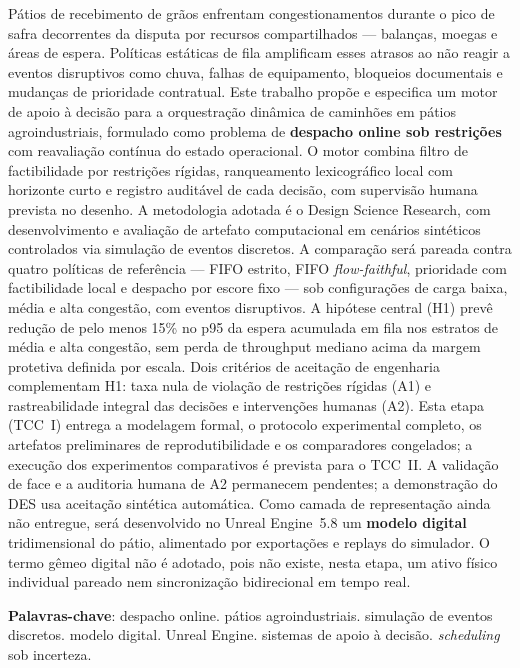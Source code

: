 \documentclass[
  12pt,
  oneside,
  a4paper,
  sumario=tradicional,
  brazil
]{abntex2}
\begin{document}
\begin{resumo}
  P\'atios de recebimento de gr\~aos enfrentam congestionamentos durante o pico de safra
  decorrentes da disputa por recursos compartilhados --- balan\c{c}as, moegas e \'areas de
  espera. Pol\'iticas est\'aticas de fila amplificam esses atrasos ao n\~ao reagir a eventos
  disruptivos como chuva, falhas de equipamento, bloqueios documentais e mudan\c{c}as de
  prioridade contratual. Este trabalho prop\~oe e especifica um motor de apoio \`a decis\~ao
  para a orquestra\c{c}\~ao din\^amica de caminh\~oes em p\'atios agroindustriais, formulado
  como problema de \textbf{despacho online sob restri\c{c}\~oes} com reavalia\c{c}\~ao
  cont\'inua do estado operacional. O motor combina filtro de factibilidade por
  restri\c{c}\~oes r\'igidas, ranqueamento lexicogr\'afico local com horizonte curto e
  registro audit\'avel de cada decis\~ao, com supervis\~ao humana prevista no desenho. A metodologia
  adotada \'e o Design Science Research, com desenvolvimento e avalia\c{c}\~ao de artefato
  computacional em cen\'arios sint\'eticos controlados via simula\c{c}\~ao de eventos
  discretos. A compara\c{c}\~ao ser\'a pareada contra quatro pol\'iticas de refer\^encia ---
  FIFO estrito, FIFO \textit{flow-faithful}, prioridade com factibilidade local e despacho
  por escore fixo --- sob configura\c{c}\~oes de carga baixa, m\'edia e alta congest\~ao,
  com eventos disruptivos. A hip\'otese central (H1) prev\^e redu\c{c}\~ao de pelo menos
  15\% no p95 da espera acumulada em fila nos estratos de m\'edia e alta congest\~ao, sem
  perda de throughput mediano acima da margem protetiva definida por escala. Dois crit\'erios de aceita\c{c}\~ao
  de engenharia complementam H1: taxa nula de viola\c{c}\~ao de restri\c{c}\~oes r\'igidas
  (A1) e rastreabilidade integral das decis\~oes e interven\c{c}\~oes humanas (A2). Esta
  etapa (TCC~I) entrega a modelagem formal, o protocolo experimental completo, os artefatos
  preliminares de reprodutibilidade e os comparadores congelados; a execu\c{c}\~ao dos experimentos
  comparativos \'e prevista para o TCC~II. A valida\c{c}\~ao de face e a auditoria humana
  de A2 permanecem pendentes; a demonstra\c{c}\~ao do DES usa aceita\c{c}\~ao sint\'etica autom\'atica.
  Como camada de representa\c{c}\~ao ainda n\~ao entregue, ser\'a
  desenvolvido no Unreal Engine~5.8 um \textbf{modelo digital} tridimensional do p\'atio,
  alimentado por exporta\c{c}\~oes e replays do simulador. O termo g\^emeo digital n\~ao \'e
  adotado, pois n\~ao existe, nesta etapa, um ativo f\'isico individual pareado nem
  sincroniza\c{c}\~ao bidirecional em tempo real.

  \vspace{\onelineskip}
  \noindent
  \textbf{Palavras-chave}: despacho online. p\'atios agroindustriais. simula\c{c}\~ao de
  eventos discretos. modelo digital. Unreal Engine. sistemas de apoio \`a decis\~ao.
  \textit{scheduling} sob incerteza.
\end{resumo}
\end{document}
